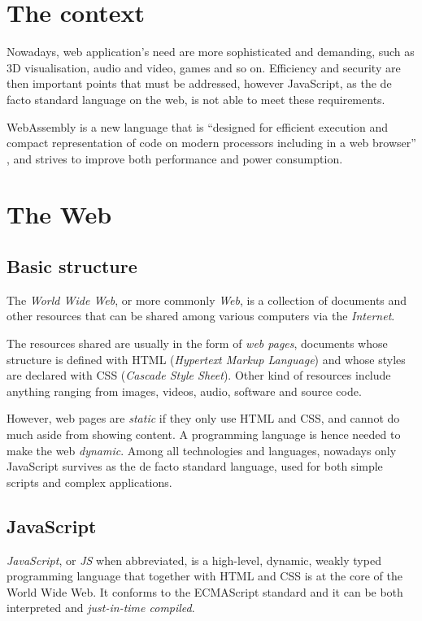 \section{The context}

Nowadays, web application's need are more sophisticated and demanding, such as 3D visualisation, audio and video,
games and so on. Efficiency and security are then important points that must be addressed, however JavaScript,
as the de facto standard language on the web, is not able to meet these requirements.

WebAssembly is a new language that is ``designed for efficient execution and compact representation of code
on modern processors including in a web browser'' \cite{wasm-w3c-announcement}, and strives to improve
both performance and power consumption.

\section{The Web}

\subsection{Basic structure}

The \textit{World Wide Web}, or more commonly \textit{Web}, is a collection of documents and other resources
that can be shared among various computers via the \textit{Internet}.

The resources shared are usually in the form of \textit{web pages}, documents whose structure is defined with HTML
(\textit{Hypertext Markup Language}) and whose styles are declared with CSS (\textit{Cascade Style Sheet}).
Other kind of resources include anything ranging from images, videos, audio, software and source code.

However, web pages are \textit{static} if they only use HTML and CSS, and cannot do much aside from showing content. A programming
language is hence needed to make the web \textit{dynamic}. Among all technologies and languages, nowadays
only JavaScript survives as the de facto standard language, used for both simple scripts and complex applications.

\subsection{JavaScript}
\label{sec:introduction-javascript}

\textit{JavaScript}, or \textit{JS} when abbreviated, is a high-level, dynamic, weakly typed programming language
that together with HTML and CSS is at the core of the World Wide Web. It conforms to the ECMAScript standard \cite{ecma-262}
and it can be both interpreted and \textit{just-in-time compiled}.

